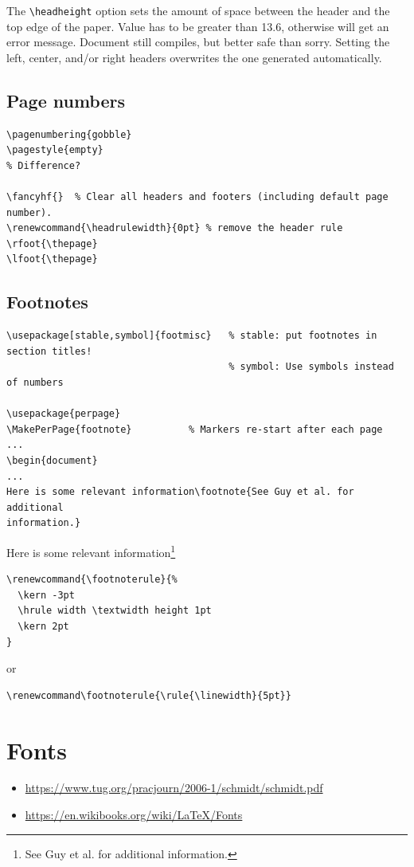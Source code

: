 \documentclass{article}
\begin{document}
The \verb|\headheight| option sets the amount of space between the
header and the top edge of the paper. Value has to be greater than
13.6, otherwise will get an error message. Document still
compiles, but better safe than sorry. Setting the left, center, and/or
right headers overwrites the one generated automatically.

\subsection{Page numbers}
\begin{lstlisting}
\pagenumbering{gobble}
\pagestyle{empty}
% Difference?

\fancyhf{}  % Clear all headers and footers (including default page number).
\renewcommand{\headrulewidth}{0pt} % remove the header rule
\rfoot{\thepage}
\lfoot{\thepage}
\end{lstlisting}

\subsection{Footnotes}
\begin{lstlisting}
\usepackage[stable,symbol]{footmisc}   % stable: put footnotes in section titles!
                                       % symbol: Use symbols instead of numbers

\usepackage{perpage}
\MakePerPage{footnote}          % Markers re-start after each page
...
\begin{document}
...
Here is some relevant information\footnote{See Guy et al. for additional
information.}
\end{lstlisting}
Here is some relevant information\footnote{See Guy et al. for additional
information.}

\begin{lstlisting}
\renewcommand{\footnoterule}{%
  \kern -3pt
  \hrule width \textwidth height 1pt
  \kern 2pt
}
\end{lstlisting}
or
\begin{lstlisting}
\renewcommand\footnoterule{\rule{\linewidth}{5pt}}
\end{lstlisting}

\newpage
\section{Fonts}
\begin{itemize}
    \item \url{https://www.tug.org/pracjourn/2006-1/schmidt/schmidt.pdf}
    \item \url{https://en.wikibooks.org/wiki/LaTeX/Fonts}
\end{itemize}
\end{document}
